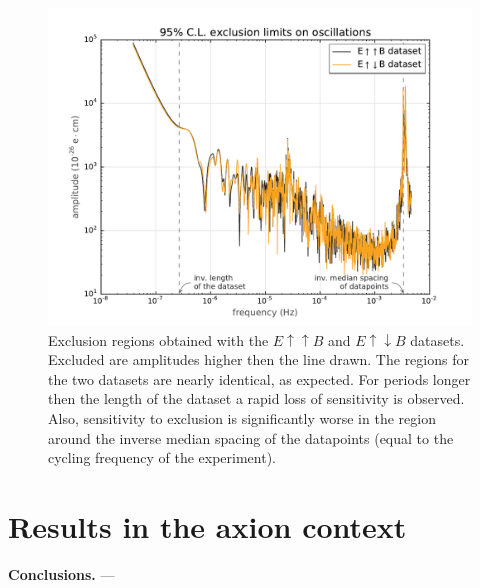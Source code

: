\begin{figure}[htb]
  \centering \includegraphics[width=\linewidth]{gfx/axions/cycle-level_exclusion_bisection.pdf}
  \caption{Exclusion regions obtained with the $E \uparrow \uparrow B$ and $E \uparrow \downarrow B$ datasets. Excluded are amplitudes higher then the line drawn. The regions for the two datasets are nearly identical, as expected. For periods longer then the length of the dataset a rapid loss of sensitivity is observed. Also, sensitivity to exclusion is significantly worse in the region around the inverse median spacing of the datapoints (equal to the cycling frequency of the experiment).}
  \label{fig:cycle-level_exclusion}
\end{figure}



\section{Results in the axion context}








\textbf{Conclusions.} ---
















